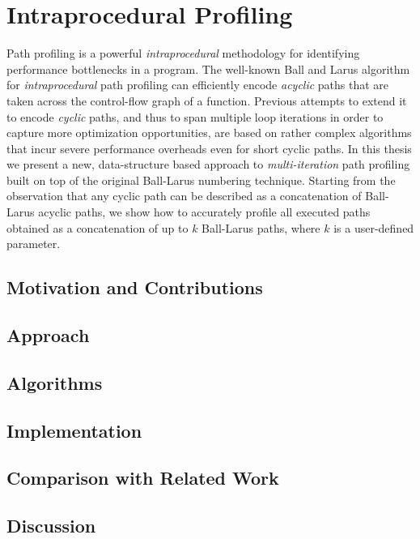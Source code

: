\section{Intraprocedural Profiling}

Path profiling is a powerful {\em intraprocedural} methodology for identifying performance bottlenecks in a program. The well-known Ball and Larus algorithm for {\em intraprocedural} path profiling can efficiently encode {\em acyclic} paths that are taken across the control-flow graph of a function. Previous attempts to extend it to encode {\em cyclic} paths, and thus to span multiple loop iterations in order to capture more optimization opportunities, are based on rather complex algorithms that incur severe performance overheads even for short cyclic paths. In this thesis we present a new, data-structure based approach to {\em multi-iteration} path profiling built on top of the original Ball-Larus numbering technique. Starting from the observation that any cyclic path can be described as a concatenation of Ball-Larus acyclic paths, we show how to accurately profile all executed paths obtained as a concatenation of up to $k$ Ball-Larus paths, where $k$ is a user-defined parameter.


\subsection{Motivation and Contributions}

\subsection{Approach}

\subsection{Algorithms}

\subsection{Implementation}

\subsection{Comparison with Related Work}

\subsection{Discussion}
